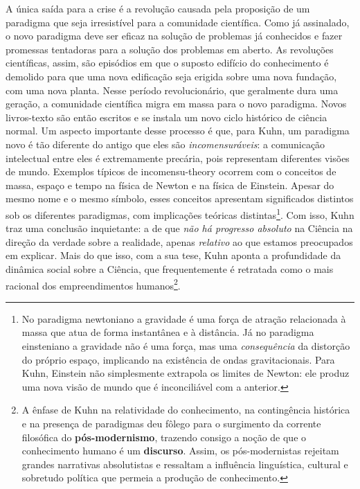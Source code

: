 \documentclass[./main.tex]{subfiles}
\begin{document}
\par A única saída para a crise é a revolução causada pela proposição de um paradigma que seja irresistível para a comunidade científica. Como já assinalado, o novo paradigma deve ser eficaz na solução de problemas já conhecidos e fazer promessas tentadoras para a solução dos problemas em aberto. As revoluções científicas, assim, são episódios em que o suposto edifício do conhecimento é demolido para que uma nova edificação seja erigida sobre uma nova fundação, com uma nova planta. Nesse período revolucionário, que geralmente dura uma geração, a comunidade científica migra em massa para o novo paradigma. Novos livros-texto são então escritos e se instala um novo ciclo histórico de ciência normal. Um aspecto importante desse processo é que, para Kuhn, um paradigma novo é tão diferente do antigo que eles são \textit{incomensuráveis}: a comunicação intelectual entre eles é extremamente precária, pois representam diferentes visões de mundo. Exemplos típicos de \gls{incomensu-theory} ocorrem com o conceitos de massa, espaço e tempo na física de Newton e na física de Einstein. Apesar do mesmo nome e o mesmo símbolo, esses conceitos apresentam significados distintos sob os diferentes paradigmas, com implicações teóricas distintas\footnote{No paradigma newtoniano a gravidade é uma força de atração relacionada à massa que atua de forma instantânea e à distância. Já no paradigma einsteniano a gravidade não é uma força, mas uma \textit{consequência} da distorção do próprio espaço, implicando na existência de ondas gravitacionais. Para Kuhn, Einstein não simplesmente extrapola os limites de Newton: ele produz uma nova visão de mundo que é inconciliável com a anterior.}. Com isso, Kuhn traz uma conclusão inquietante: a de que \textit{não há progresso absoluto} na Ciência na direção da verdade sobre a realidade, apenas \textit{relativo} ao que estamos preocupados em explicar. Mais do que isso, com a sua tese, Kuhn aponta a profundidade da dinâmica social sobre a Ciência, que frequentemente é retratada como o mais racional dos empreendimentos humanos\footnote{A ênfase de Kuhn na relatividade do conhecimento, na contingência histórica e na presença de paradigmas deu fôlego para o surgimento da corrente filosófica do \textbf{pós-modernismo}, trazendo consigo a noção de que o conhecimento humano é um \textbf{discurso}. Assim, os pós-modernistas rejeitam grandes narrativas absolutistas e ressaltam a influência linguística, cultural e sobretudo política que permeia a produção de conhecimento.}.
\end{document}
